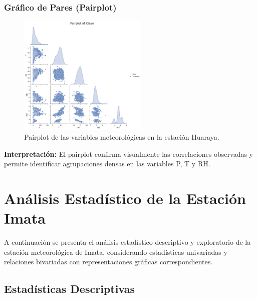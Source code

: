 \subsubsection*{Gráfico de Pares (Pairplot)}
\begin{figure}[H]
\centering
\includegraphics[width=0.55\textwidth]{resultados/por_estacion_meteorologica/Huaraya/pairplot.png}
\caption{Pairplot de las variables meteorológicas en la estación Huaraya.}
\label{fig:huaraya_pairplot}
\end{figure}
\textbf{Interpretación:} El pairplot confirma visualmente las correlaciones observadas y permite identificar agrupaciones densas en las variables P, T y RH.



\section{Análisis Estadístico de la Estación Imata}

A continuación se presenta el análisis estadístico descriptivo y exploratorio de la estación meteorológica de Imata, considerando estadísticas univariadas y relaciones bivariadas con representaciones gráficas correspondientes.

\subsection{Estadísticas Descriptivas}

